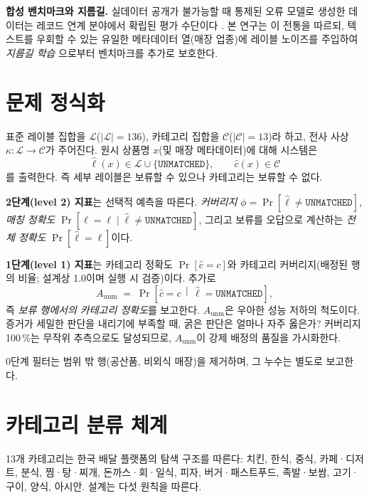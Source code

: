 \documentclass[10pt,twocolumn]{article}
\newcommand{\unmatched}{\texttt{UNMATCHED}}
\begin{document}
\textbf{합성 벤치마크와 지름길.}
실데이터 공개가 불가능할 때 통제된 오류 모델로 생성한 데이터는 레코드
연계 분야에서 확립된 평가 수단이다 \cite{christen2005}. 본 연구는 이
전통을 따르되, 텍스트를 우회할 수 있는 유일한 메타데이터 열(매장 업종)에
레이블 노이즈를 주입하여 \emph{지름길 학습} \cite{geirhos2020}으로부터
벤치마크를 추가로 보호한다.

\section{문제 정식화}
\label{sec:task}

표준 레이블 집합을 $\mathcal{L}$($|\mathcal{L}|{=}136$), 카테고리 집합을
$\mathcal{C}$($|\mathcal{C}|{=}13$)라 하고, 전사 사상
$\kappa:\mathcal{L}\rightarrow\mathcal{C}$가 주어진다. 원시 상품명
$x$(및 매장 메타데이터)에 대해 시스템은
\[
\hat{\ell}(x)\in\mathcal{L}\cup\{\unmatched\},\qquad
\hat{c}(x)\in\mathcal{C}
\]
를 출력한다. 즉 세부 레이블은 보류할 수 있으나 카테고리는 보류할 수
없다.

\textbf{2단계(level 2) 지표}는 선택적 예측을 따른다. \emph{커버리지}
$\phi=\Pr[\hat{\ell}\neq\unmatched]$, \emph{매칭 정확도}
$\Pr[\hat{\ell}=\ell \mid \hat{\ell}\neq\unmatched]$, 그리고 보류를
오답으로 계산하는 \emph{전체 정확도} $\Pr[\hat{\ell}=\ell]$이다.

\textbf{1단계(level 1) 지표}는 카테고리 정확도 $\Pr[\hat{c}=c]$와
카테고리 커버리지(배정된 행의 비율; 설계상 1.0이며 실행 시 검증)이다.
추가로
\[
A_{\text{unm}}
  \;=\;
  \Pr\!\left[\hat{c}=c \,\middle|\, \hat{\ell}=\unmatched\right],
\]
즉 \emph{보류 행에서의 카테고리 정확도}를 보고한다. $A_{\text{unm}}$은
우아한 성능 저하의 척도이다. 증거가 세밀한 판단을 내리기에 부족할 때,
굵은 판단은 얼마나 자주 옳은가? 커버리지 100\,\%는 무작위 추측으로도
달성되므로, $A_{\text{unm}}$이 강제 배정의 품질을 가시화한다.

0단계 필터는 범위 밖 행(공산품, 비외식 매장)을 제거하며, 그 누수는
별도로 보고한다.

\section{카테고리 분류 체계}
\label{sec:taxonomy}

13개 카테고리는 한국 배달 플랫폼의 탐색 구조를 따른다: 치킨, 한식, 중식,
카페·디저트, 분식, 찜·탕·찌개, 돈까스·회·일식, 피자, 버거·패스트푸드,
족발·보쌈, 고기·구이, 양식, 아시안. 설계는 다섯 원칙을 따른다.
\end{document}
